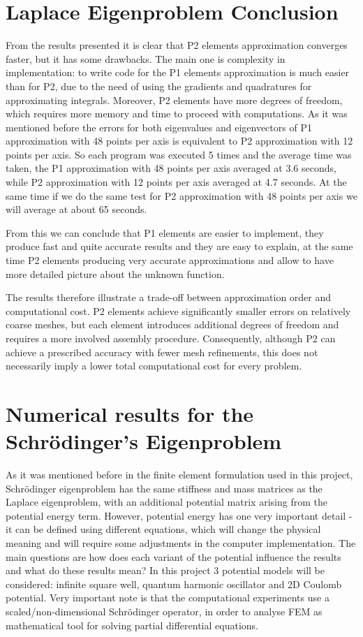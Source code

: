 \documentclass[conference]{IEEEtran}
\begin{document}
\section{Laplace Eigenproblem Conclusion}
From the results presented it is clear that P2 elements approximation converges faster, but it has some drawbacks. The main one is complexity in implementation: to write code for the P1 elements approximation is much easier than for P2, due to the need of using the gradients and quadratures for approximating integrals.
Moreover, P2 elements have more degrees of freedom, which requires more memory and time to proceed with computations. As it was mentioned before the errors for both eigenvalues and eigenvectors of P1 approximation with 48 points per axis is equivalent to P2 approximation with 12 points per axis.
So each program was executed 5 times and the average time was taken, the P1 approximation with 48 points per axis averaged at 3.6 seconds, while P2 approximation with 12 points per axis averaged at 4.7 seconds. At the same time if we do the same test for P2 approximation with 48 points per axis we will average at about 65 seconds.

From this we can conclude that P1 elements are easier to implement, they produce fast and quite accurate results and they are easy to explain, at the same time P2 elements producing very accurate approximations and allow to have more detailed picture about the unknown function.

The results therefore illustrate a trade-off between approximation order and computational cost. P2 elements achieve significantly smaller errors on relatively coarse meshes, but each element introduces additional degrees of freedom and requires a more involved assembly procedure. Consequently, although P2 can achieve a prescribed accuracy with fewer mesh refinements, this does not necessarily imply a lower total computational cost for every problem.



\section{Numerical results for the Schr\"{o}dinger's Eigenproblem}

As it was mentioned before in the finite element formulation used in this project, Schr\"{o}dinger eigenproblem has the same stiffness and mass matrices as the Laplace eigenproblem, with an additional potential matrix arising from the potential energy term. However, potential energy has one very important detail - it can be defined using different equations, which will change the physical meaning and will require some adjustments in the computer implementation. The main questions are how does each variant of the potential influence the results and what do these results mean? 
In this project 3 potential models will be considered: infinite square well, quantum harmonic oscillator and 2D Coulomb potential. Very important note is that the computational experiments use a scaled/non-dimensional Schr\"{o}dinger operator, in order to analyse FEM as mathematical tool for solving partial differential equations.
\end{document}
